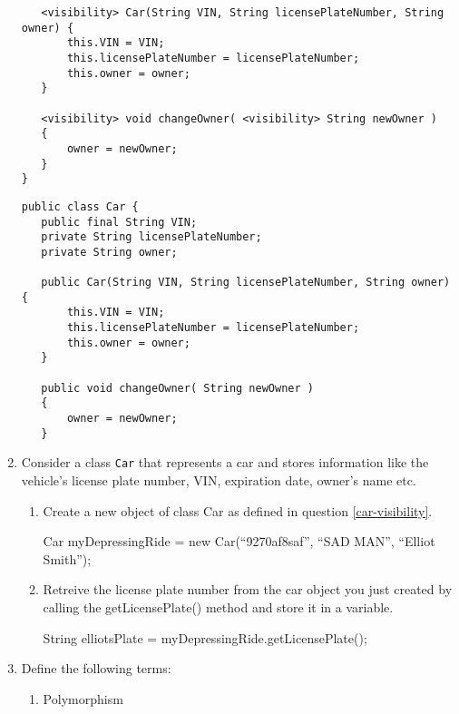\documentclass[11pt]{article}
\newenvironment{answer}{\large\lstset{basicstyle=\large}\color{white}}{}
\newenvironment{answer}{\large\lstset{basicstyle=\large}\color{red}}{}
\begin{document}
\begin{enumerate}
\begin{lstlisting}
   <visibility> Car(String VIN, String licensePlateNumber, String owner) {
       this.VIN = VIN;
       this.licensePlateNumber = licensePlateNumber;
       this.owner = owner;
   }

   <visibility> void changeOwner( <visibility> String newOwner )
   {
       owner = newOwner;
   }
}
\end{lstlisting}

    \begin{answer}
\begin{lstlisting}
public class Car {
   public final String VIN;
   private String licensePlateNumber;  
   private String owner;

   public Car(String VIN, String licensePlateNumber, String owner) {
       this.VIN = VIN;
       this.licensePlateNumber = licensePlateNumber;
       this.owner = owner;
   }

   public void changeOwner( String newOwner )
   {
       owner = newOwner;
   }
\end{lstlisting}
    \end{answer}

\item Consider a class {\tt Car} that represents a car and stores information
      like the vehicle's license plate number, VIN, expiration date, owner's
      name etc.

    \begin{enumerate}
    \item Create a new object of class Car as defined in question
        \ref{car-visibility}.
        
        \begin{answer}
        Car myDepressingRide = new Car(``9270af8saf'', ``SAD MAN'', ``Elliot
        Smith'');
        \end{answer}

    \item Retreive the license plate number from the car object you just
    created by calling the getLicensePlate() method and store it in a variable.

        \begin{answer}
        String elliotsPlate = myDepressingRide.getLicensePlate();
        \end{answer}
    \end{enumerate}

\item Define the following terms:
    \begin{enumerate}
    \item Polymorphism


\end{enumerate}
\end{enumerate}
\end{document}
